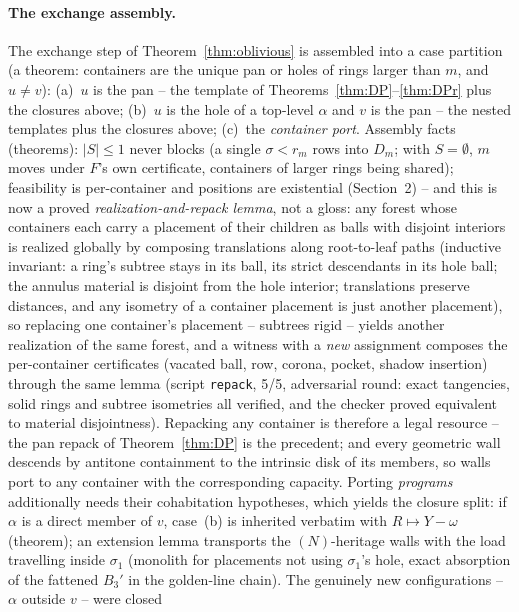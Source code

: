 \documentclass[11pt]{article}
\theoremstyle{definition}
\begin{document}
\paragraph{The exchange assembly.} The exchange step of
Theorem~\ref{thm:oblivious} is assembled into a case partition
(a theorem: containers are the unique pan or holes of rings larger
than $m$, and $u\ne v$): (a)~$u$ is the pan -- the template of
Theorems~\ref{thm:DP}--\ref{thm:DPr} plus the closures above;
(b)~$u$ is the hole of a top-level $\alpha$ and $v$ is the pan -- the
nested templates plus the closures above; (c)~the \emph{container
port}. Assembly facts (theorems): $|S|\le1$ never blocks (a single
$\sigma<r_m$ rows into $D_m$; with $S=\emptyset$, $m$ moves under
$F$'s own certificate, containers of larger rings being shared);
feasibility is per-container and positions are existential
(Section~2) -- and this is now a proved \emph{realization-and-repack
lemma}, not a gloss: any forest whose containers each carry a
placement of their children as balls with disjoint interiors is
realized globally by composing translations along root-to-leaf
paths (inductive invariant: a ring's subtree stays in its ball, its
strict descendants in its hole ball; the annulus material is
disjoint from the hole interior; translations preserve distances,
and any isometry of a container placement is just another
placement), so replacing one container's placement -- subtrees
rigid -- yields another realization of the same forest, and a
witness with a \emph{new} assignment composes the per-container
certificates (vacated ball, row, corona, pocket, shadow insertion)
through the same lemma (script \texttt{repack}, 5/5, adversarial
round: exact tangencies, solid rings and subtree isometries all
verified, and the checker proved equivalent to material
disjointness). Repacking any container is therefore a legal
resource -- the pan repack of
Theorem~\ref{thm:DP} is the precedent; and every geometric wall
descends by antitone containment to the intrinsic disk of its
members, so walls port to any container with the corresponding
capacity. Porting \emph{programs} additionally needs their
cohabitation hypotheses, which yields the closure split: if $\alpha$
is a direct member of $v$, case~(b) is inherited verbatim with
$R\mapsto Y-\omega$ (theorem); an extension lemma transports the
$(N)$-heritage walls with the load travelling inside $\sigma_1$
(monolith for placements not using $\sigma_1$'s hole, exact
absorption of the fattened $B_3'$ in the golden-line chain). The
genuinely new configurations -- $\alpha$ outside $v$ -- were closed
\end{document}
